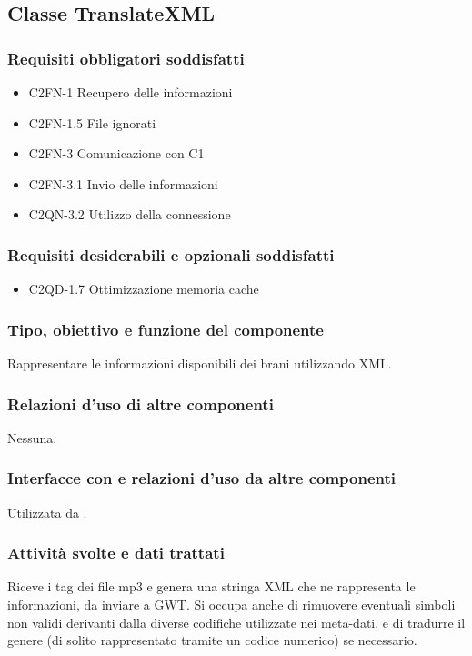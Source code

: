 \subsection{Classe TranslateXML}
\subsubsection*{Requisiti obbligatori soddisfatti}
\begin{itemize}
   \item C2FN-1 Recupero delle informazioni
   \item C2FN-1.5 File ignorati
   \item C2FN-3 Comunicazione con C1
   \item C2FN-3.1 Invio delle informazioni
   \item C2QN-3.2 Utilizzo della connessione
\end{itemize}
\subsubsection*{Requisiti desiderabili e opzionali soddisfatti}
\begin{itemize}
   \item C2QD-1.7 Ottimizzazione memoria cache
\end{itemize}
\subsubsection*{Tipo, obiettivo e funzione del componente}
Rappresentare le informazioni disponibili dei brani utilizzando XML.

\subsubsection*{Relazioni d'uso di altre componenti}
Nessuna.

\subsubsection*{Interfacce con e relazioni d'uso da altre componenti}
Utilizzata da .

\subsubsection*{Attivit\`a svolte e dati trattati}
Riceve i tag dei file mp3 e genera una stringa XML che ne rappresenta le
informazioni, da inviare a GWT.
Si occupa anche di rimuovere eventuali simboli non validi derivanti dalla
diverse codifiche utilizzate nei meta-dati, e di tradurre il genere (di solito
rappresentato tramite un codice numerico) se necessario.
\\
\\

